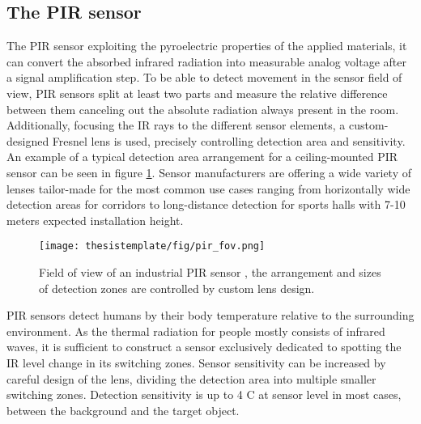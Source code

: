 \subsection{The PIR sensor}
 The PIR sensor exploiting the pyroelectric properties of the applied materials, it can convert the absorbed infrared radiation into measurable analog voltage after a signal amplification step. 
 To be able to detect movement in the sensor field of view, PIR sensors split at least two parts and measure the relative difference between them canceling out the absolute radiation always present in the room. Additionally, focusing the IR rays to the different sensor elements, a custom-designed Fresnel lens is used, precisely controlling detection area and sensitivity. An example of a typical detection area arrangement for a ceiling-mounted PIR sensor can be seen in figure \ref{fig:pir_fov}. Sensor manufacturers are offering a wide variety of lenses tailor-made for the most common use cases ranging from horizontally wide detection areas for corridors to long-distance detection for sports halls with 7-10 meters expected installation height.

\begin{figure}[ht!]
  \begin{center}
    \texttt{[image: thesistemplate/fig/pir\_fov.png]}
    \caption{Field of view of an industrial PIR sensor \cite{papir_dsheet}, the arrangement and sizes of detection zones are controlled by custom lens design.}
    \label{fig:pir_fov}
  \end{center}
\end{figure}

PIR sensors detect humans by their body temperature relative to the surrounding environment. As the thermal radiation for people mostly consists of infrared waves, it is sufficient to construct a sensor exclusively dedicated to spotting the IR level change in its switching zones. Sensor sensitivity can be increased by careful design of the lens, dividing the detection area into multiple smaller switching zones. Detection sensitivity is up to 4 \textdegree C at sensor level in most cases, between the background and the target object.


